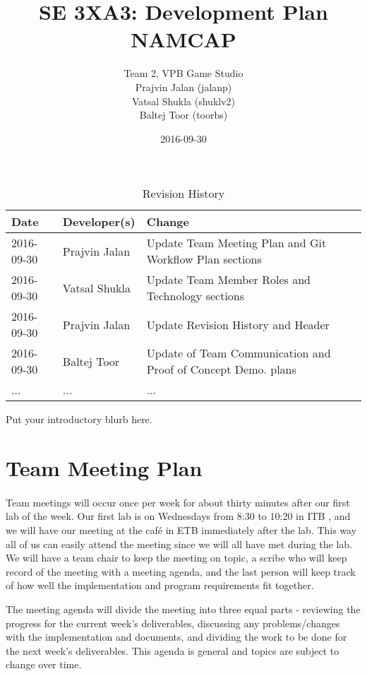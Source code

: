 \documentclass{article}
\title{SE 3XA3: Development Plan\\NAMCAP}
\author{Team 2, VPB Game Studio
		\\ Prajvin Jalan (jalanp)
		\\ Vatsal Shukla (shuklv2)
		\\ Baltej Toor (toorbs)
}
\date{2016-09-30}
\begin{document}
\begin{table}[hp]
\caption{Revision History} \label{TblRevisionHistory}
\begin{tabularx}{\textwidth}{llX}
\toprule
\textbf{Date} & \textbf{Developer(s)} & \textbf{Change}\\
\midrule
2016-09-30 & Prajvin Jalan & Update Team Meeting Plan and Git Workflow Plan sections\\
2016-09-30 & Vatsal Shukla & Update Team Member Roles and Technology sections \\
2016-09-30 & Prajvin Jalan & Update Revision History and Header\\
2016-09-30 & Baltej Toor & Update of Team Communication and Proof of Concept Demo. plans\\
... & ... & ...\\
\bottomrule
\end{tabularx}
\end{table}

\newpage

\maketitle

Put your introductory blurb here.

\section{Team Meeting Plan}

\paragraph{}
Team meetings will occur once per week for about thirty minutes after our first lab of the week. Our first lab is on Wednesdays from 8:30 to 10:20 in ITB , and we will have our meeting at the café in ETB immediately after the lab. This way all of us can easily attend the meeting since we will all have met during the lab. We will have a team chair to keep the meeting on topic, a scribe who will keep record of the meeting with a meeting agenda, and the last person will keep track of how well the implementation and program requirements fit together.\par The meeting agenda will divide the meeting into three equal parts - reviewing the progress for the current week's deliverables, discussing any problems/changes with the implementation and documents, and dividing the work to be done for the next week's deliverables. This agenda is general and topics are subject to change over time.
\end{document}

